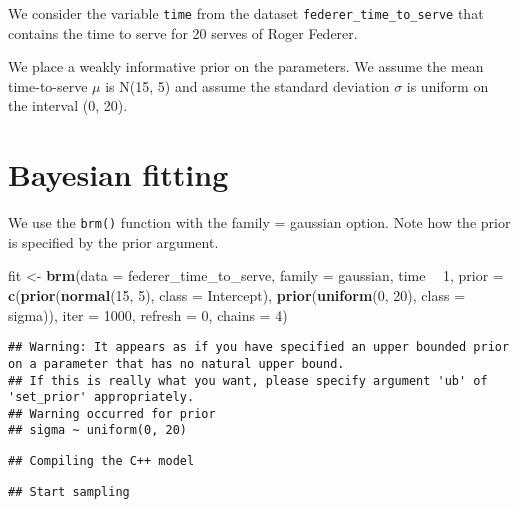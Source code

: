 \documentclass[
]{book}
\newenvironment{Shaded}{\begin{snugshade}}{\end{snugshade}}
\newcommand{\DataTypeTok}[1]{\textcolor[rgb]{0.13,0.29,0.53}{#1}}
\newcommand{\DecValTok}[1]{\textcolor[rgb]{0.00,0.00,0.81}{#1}}
\newcommand{\KeywordTok}[1]{\textcolor[rgb]{0.13,0.29,0.53}{\textbf{#1}}}
\newcommand{\NormalTok}[1]{#1}
\newcommand{\OperatorTok}[1]{\textcolor[rgb]{0.81,0.36,0.00}{\textbf{#1}}}
\newcommand{\StringTok}[1]{\textcolor[rgb]{0.31,0.60,0.02}{#1}}
\begin{document}
We consider the variable \texttt{time} from the dataset \texttt{federer\_time\_to\_serve} that contains the time to serve for 20 serves of Roger Federer.

We place a weakly informative prior on the parameters. We assume the mean time-to-serve \(\mu\) is N(15, 5) and assume the standard deviation \(\sigma\) is uniform on the interval (0, 20).

\hypertarget{bayesian-fitting}{%
\section{Bayesian fitting}\label{bayesian-fitting}}

We use the \texttt{brm()} function with the family = gaussian option. Note how the prior is specified by the prior argument.

\begin{Shaded}
\begin{Highlighting}[]
\NormalTok{fit <-}\StringTok{ }\KeywordTok{brm}\NormalTok{(}\DataTypeTok{data =}\NormalTok{ federer_time_to_serve, }
            \DataTypeTok{family =}\NormalTok{ gaussian,}
\NormalTok{            time }\OperatorTok{~}\StringTok{ }\DecValTok{1}\NormalTok{,}
    \DataTypeTok{prior =} \KeywordTok{c}\NormalTok{(}\KeywordTok{prior}\NormalTok{(}\KeywordTok{normal}\NormalTok{(}\DecValTok{15}\NormalTok{, }\DecValTok{5}\NormalTok{), }\DataTypeTok{class =}\NormalTok{ Intercept),}
              \KeywordTok{prior}\NormalTok{(}\KeywordTok{uniform}\NormalTok{(}\DecValTok{0}\NormalTok{, }\DecValTok{20}\NormalTok{), }\DataTypeTok{class =}\NormalTok{ sigma)),}
    \DataTypeTok{iter =} \DecValTok{1000}\NormalTok{, }\DataTypeTok{refresh =} \DecValTok{0}\NormalTok{, }\DataTypeTok{chains =} \DecValTok{4}\NormalTok{)}
\end{Highlighting}
\end{Shaded}

\begin{verbatim}
## Warning: It appears as if you have specified an upper bounded prior on a parameter that has no natural upper bound.
## If this is really what you want, please specify argument 'ub' of 'set_prior' appropriately.
## Warning occurred for prior 
## sigma ~ uniform(0, 20)
\end{verbatim}

\begin{verbatim}
## Compiling the C++ model
\end{verbatim}

\begin{verbatim}
## Start sampling
\end{verbatim}
\end{document}
